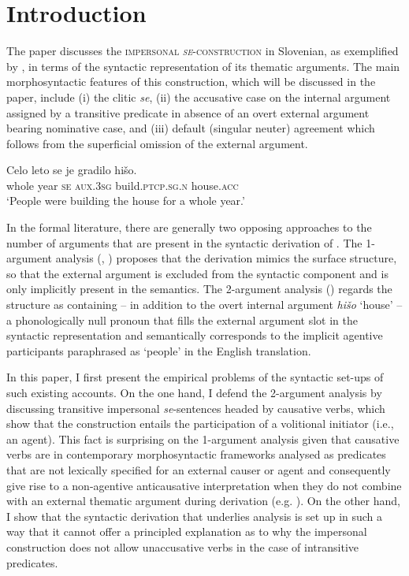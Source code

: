 \documentclass[output=paper,
modfonts,nonflat,
newtxmath
]{langsci/langscibook}
\author{Jakob Lenardič\affiliation{University of Ljubljana}
}
\begin{document}
\maketitle

\section{Introduction} 
The paper discusses the \textsc{impersonal \textit{se}-construction} in Slovenian, as exemplified by , in terms of the syntactic representation of its thematic arguments. The main morphosyntactic features of this construction, which will be discussed in the paper, include (i) the clitic \textit{se}, (ii) the accusative case on the internal argument assigned by a transitive predicate in absence of an overt external argument bearing nominative case, and (iii) default (singular neuter) agreement which follows from the superficial omission of the external argument.

\ea  \label{ex:lenardic:1}
\gll Celo leto se je gradilo hišo.\\
   whole year \textsc{se} \textsc{aux}.\textsc{3sg} build.\textsc{ptcp.sg.n} house.\textsc{acc}\\
\glt `People were building the house for a whole year.'
\z

\noindent In the formal literature, there are generally two opposing approaches to the number of arguments that are present in the syntactic derivation of . The 1-argument analysis (\citealt{marelj2004}, \citealt{grahek2008}) proposes that the derivation mimics the surface structure, so that the external argument is excluded from the syntactic component and is only implicitly present in the semantics. The 2-argument analysis (\citealt{riverosheppard2003}) regards the structure as containing – in addition to the overt internal argument \textit{hišo} `house' – a phonologically null pronoun that fills the external argument slot in the syntactic representation and semantically corresponds to the implicit agentive participants paraphrased as `people' in the English translation. \par

In this paper, I first present the empirical problems of the syntactic set-ups of such existing accounts. On the one hand, I defend the 2-argument analysis by discussing transitive impersonal \textit{se}-sentences headed by causative verbs, which show that the construction entails the participation of a volitional initiator (i.e., an agent). This fact is surprising on the 1-argument analysis given that causative verbs are in contemporary morphosyntactic frameworks analysed as predicates that are not lexically specified for an external causer or agent and consequently give rise to a non-agentive anticausative interpretation when they do not combine with an external thematic argument during derivation (e.g. \citealt{alexiadouet2015}). On the other hand, I show that the syntactic derivation that underlies  analysis is set up in such a way that it cannot offer a principled explanation as to why the impersonal construction does not allow unaccusative verbs in the case of intransitive predicates. \par
\end{document}
